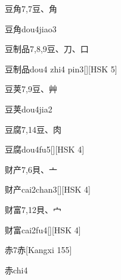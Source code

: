 \begin{entry}{豆角}{7,7}{⾖、⾓}
  \begin{phonetics}{豆角}{dou4jiao3}
  \end{phonetics}
\end{entry}

\begin{entry}{豆制品}{7,8,9}{⾖、⼑、⼝}
  \begin{phonetics}{豆制品}{dou4 zhi4 pin3}[][HSK 5]
  \end{phonetics}
\end{entry}

\begin{entry}{豆荚}{7,9}{⾖、⾋}
  \begin{phonetics}{豆荚}{dou4jia2}
  \end{phonetics}
\end{entry}

\begin{entry}{豆腐}{7,14}{⾖、⾁}
  \begin{phonetics}{豆腐}{dou4fu5}[][HSK 4]
  \end{phonetics}
\end{entry}

\begin{entry}{财产}{7,6}{⾙、⼇}
  \begin{phonetics}{财产}{cai2chan3}[][HSK 4]
  \end{phonetics}
\end{entry}

\begin{entry}{财富}{7,12}{⾙、⼧}
  \begin{phonetics}{财富}{cai2fu4}[][HSK 4]
  \end{phonetics}
\end{entry}

\begin{entry}{赤}{7}{⾚}[Kangxi 155]
  \begin{phonetics}{赤}{chi4}
  \end{phonetics}
\end{entry}

